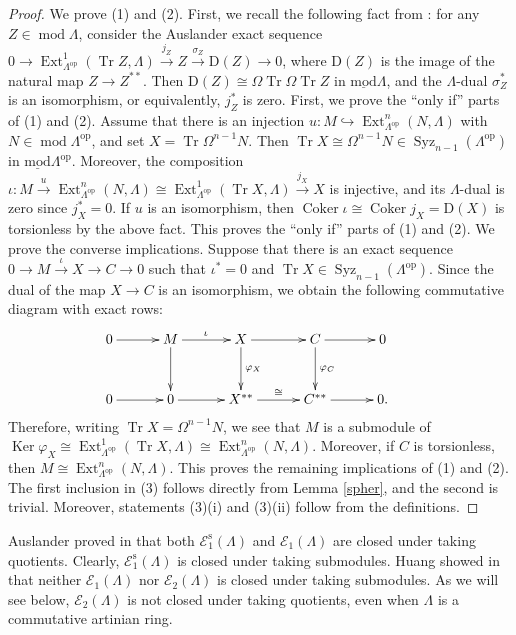 \documentclass{amsart}
\theoremstyle{definition}
\theoremstyle{remark}
\numberwithin{equation}{thm}
\def\Cok{\operatorname{Coker}}
\def\D{\mathrm{D}}
\def\E{\mathcal{E}}
\def\Ext{\operatorname{Ext}}
\def\Ker{\operatorname{Ker}}
\def\lmod{\operatorname{\underline{mod}}}
\def\mod{\operatorname{mod}}
\def\syz{\Omega}
\def\Syz{\operatorname{Syz}}
\def\tr{\operatorname{Tr}}
\begin{document}
\begin{proof}
We prove (1) and (2). First, we recall the following fact from \cite[Appendix]{AB}: for any $Z\in\mod\Lambda$, consider the Auslander exact sequence
$0\to\Ext^1_{\Lambda^{\mathrm{op}}}(\tr Z,\Lambda)\xrightarrow{j_Z}Z\xrightarrow{\sigma_Z}\D(Z)\to0$,
where $\D(Z)$ is the image of the natural map $Z\to Z^{\ast\ast}$.
Then $\D(Z)\cong\syz\tr\syz\tr Z$ in $\lmod\Lambda$, and the $\Lambda$-dual $\sigma_Z^\ast$ is an isomorphism, or equivalently, $j_Z^\ast$ is zero.
First, we prove the ``only if'' parts of (1) and (2).
Assume that there is an injection $u:M\hookrightarrow\Ext^n_{\Lambda^{\mathrm{op}}}(N,\Lambda)$ with $N\in\mod\Lambda^{\mathrm{op}}$, and set $X=\tr\syz^{n-1}N$.
Then $\tr X\cong\syz^{n-1}N\in\Syz_{n-1}(\Lambda^{\mathrm{op}})$ in $\lmod\Lambda^{\mathrm{op}}$.
Moreover, the composition
$\iota:M\xrightarrow{u}\Ext^n_{\Lambda^{\mathrm{op}}}(N,\Lambda)\cong\Ext^1_{\Lambda^{\mathrm{op}}}(\tr X,\Lambda)\xrightarrow{j_X}X$
is injective, and its $\Lambda$-dual is zero since $j_X^\ast=0$.
If $u$ is an isomorphism, then $\Cok\iota\cong\Cok j_X=\D(X)$ is torsionless by the above fact.
This proves the ``only if'' parts of (1) and (2).
We prove the converse implications.
Suppose that there is an exact sequence $0\to M\xrightarrow{\iota}X\to C\to0$ such that $\iota^\ast=0$ and $\tr X\in\Syz_{n-1}(\Lambda^{\mathrm{op}})$.
Since the dual of the map $X\to C$ is an isomorphism, we obtain the following commutative diagram with exact rows:
$$
\xymatrix@R-1pc@C-1pc{
0\ar[rr]&&M\ar[rr]^{\iota}\ar[dd]&&X\ar[rr]\ar[dd]^-{\varphi_X}&&C\ar[rr]\ar[dd]^-{\varphi_C}&&0\\
&&&&&&&&&\\
0\ar[rr]&&0\ar[rr]&&X^{\ast\ast}\ar[rr]^-{\cong}&&C^{\ast\ast}\ar[rr]&&0.
}
$$
Therefore, writing $\tr X=\syz^{n-1}N$, we see that $M$ is a submodule of $\Ker\varphi_X\cong\Ext^1_{\Lambda^{\mathrm{op}}}(\tr X,\Lambda)\cong\Ext^n_{\Lambda^{\mathrm{op}}}(N,\Lambda)$.
Moreover, if $C$ is torsionless, then $M\cong\Ext^n_{\Lambda^{\mathrm{op}}}(N,\Lambda)$.
This proves the remaining implications of (1) and (2).
The first inclusion in (3) follows directly from Lemma \ref{spher}, and the second is trivial.
Moreover, statements (3)(i) and (3)(ii) follow from the definitions.
\end{proof}

Auslander proved in \cite[Proposition 3.3]{Aus69} that both $\E_1^{\mathrm{s}}(\Lambda)$ and $\E_1(\Lambda)$ are closed under taking quotients.
Clearly, $\E_1^{\mathrm{s}}(\Lambda)$ is closed under taking submodules.
Huang showed in \cite[Example 4.2]{Hu09} that neither $\E_1(\Lambda)$ nor $\E_2(\Lambda)$ is closed under taking submodules.
As we will see below, $\E_2(\Lambda)$ is not closed under taking quotients, even when $\Lambda$ is a commutative artinian ring.
\end{document}
